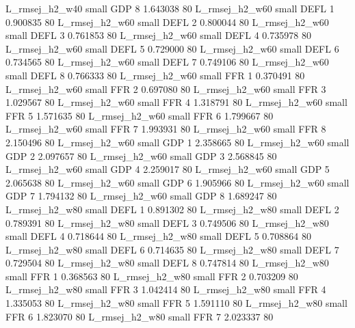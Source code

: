 L_rmsej_h2_w40      small      GDP                 8 1.643038 80
L_rmsej_h2_w60      small     DEFL                 1 0.900835 80
L_rmsej_h2_w60      small     DEFL                 2 0.800044 80
L_rmsej_h2_w60      small     DEFL                 3 0.761853 80
L_rmsej_h2_w60      small     DEFL                 4 0.735978 80
L_rmsej_h2_w60      small     DEFL                 5 0.729000 80
L_rmsej_h2_w60      small     DEFL                 6 0.734565 80
L_rmsej_h2_w60      small     DEFL                 7 0.749106 80
L_rmsej_h2_w60      small     DEFL                 8 0.766333 80
L_rmsej_h2_w60      small      FFR                 1 0.370491 80
L_rmsej_h2_w60      small      FFR                 2 0.697080 80
L_rmsej_h2_w60      small      FFR                 3 1.029567 80
L_rmsej_h2_w60      small      FFR                 4 1.318791 80
L_rmsej_h2_w60      small      FFR                 5 1.571635 80
L_rmsej_h2_w60      small      FFR                 6 1.799667 80
L_rmsej_h2_w60      small      FFR                 7 1.993931 80
L_rmsej_h2_w60      small      FFR                 8 2.150496 80
L_rmsej_h2_w60      small      GDP                 1 2.358665 80
L_rmsej_h2_w60      small      GDP                 2 2.097657 80
L_rmsej_h2_w60      small      GDP                 3 2.568845 80
L_rmsej_h2_w60      small      GDP                 4 2.259017 80
L_rmsej_h2_w60      small      GDP                 5 2.065638 80
L_rmsej_h2_w60      small      GDP                 6 1.905966 80
L_rmsej_h2_w60      small      GDP                 7 1.794132 80
L_rmsej_h2_w60      small      GDP                 8 1.689247 80
L_rmsej_h2_w80      small     DEFL                 1 0.891302 80
L_rmsej_h2_w80      small     DEFL                 2 0.789391 80
L_rmsej_h2_w80      small     DEFL                 3 0.749506 80
L_rmsej_h2_w80      small     DEFL                 4 0.718644 80
L_rmsej_h2_w80      small     DEFL                 5 0.708864 80
L_rmsej_h2_w80      small     DEFL                 6 0.714635 80
L_rmsej_h2_w80      small     DEFL                 7 0.729504 80
L_rmsej_h2_w80      small     DEFL                 8 0.747814 80
L_rmsej_h2_w80      small      FFR                 1 0.368563 80
L_rmsej_h2_w80      small      FFR                 2 0.703209 80
L_rmsej_h2_w80      small      FFR                 3 1.042414 80
L_rmsej_h2_w80      small      FFR                 4 1.335053 80
L_rmsej_h2_w80      small      FFR                 5 1.591110 80
L_rmsej_h2_w80      small      FFR                 6 1.823070 80
L_rmsej_h2_w80      small      FFR                 7 2.023337 80
